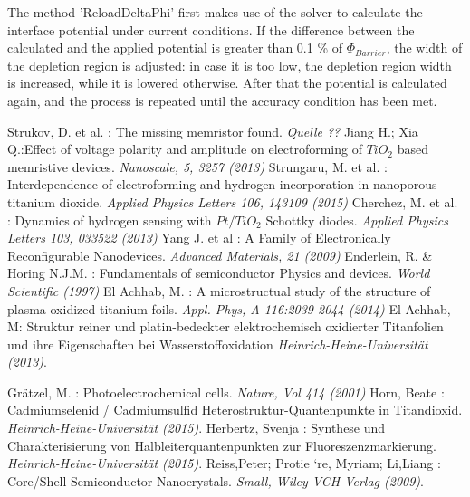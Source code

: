 \documentclass[12pt]{article}
\begin{document}
The method 'ReloadDeltaPhi' first makes use of the solver to calculate the interface potential under current conditions. If the difference between the calculated and the applied potential is greater than 0.1 \% of $\Phi_{Barrier}$, the width of the depletion region is adjusted:
in case it is too low, the depletion region width is increased, while it is lowered otherwise. After that the potential is calculated again, and the process is repeated until the accuracy condition has been met.
		
		
\newpage
\begin{thebibliography}{}


						Strukov, D. et al. : The missing memristor found.					
						{\sl Quelle ??}
						Jiang H.; Xia Q.:Effect of voltage polarity and amplitude on electroforming of $TiO_2$ based memristive devices. 						
						{\sl Nanoscale, 5, 3257 (2013)}
						Strungaru, M. et al. : Interdependence of electroforming and hydrogen incorporation in nanoporous titanium dioxide.
						{\sl Applied Physics Letters 106, 143109 (2015)}
						Cherchez, M. et al. : Dynamics of hydrogen sensing with $Pt/TiO_2$ Schottky diodes.
						{\sl Applied Physics Letters 103, 033522 (2013)}
						Yang J. et al : A Family of Electronically Reconfigurable Nanodevices.
						{\sl Advanced Materials, 21 (2009)}
						Enderlein, R. \& Horing N.J.M. : Fundamentals of semiconductor Physics and devices.
						{\sl World Scientific (1997)}
						El Achhab, M. : A microstructual study of the structure of plasma oxidized titanium foils.
						{\sl Appl. Phys, A 116:2039-2044 (2014)}
						El Achhab, M: Struktur reiner und platin-bedeckter elektrochemisch oxidierter Titanfolien und ihre Eigenschaften bei Wasserstoffoxidation 
						{\sl Heinrich-Heine-Universität (2013)}.


 Grätzel, M. : Photoelectrochemical cells. 						
						{\sl Nature, Vol 414 (2001)}
 Horn, Beate : Cadmiumselenid / Cadmiumsulfid Heterostruktur-Quantenpunkte in Titandioxid.
						{\sl Heinrich-Heine-Universität (2015)}.
 Herbertz, Svenja : Synthese und Charakterisierung von Halbleiterquantenpunkten zur Fluoreszenzmarkierung.
						{\sl Heinrich-Heine-Universität (2015)}.						
 Reiss,Peter; Protie `re, Myriam; Li,Liang : Core/Shell Semiconductor Nanocrystals.
						{\sl Small, Wiley-VCH Verlag (2009)}.


\end{thebibliography}
\end{document}
